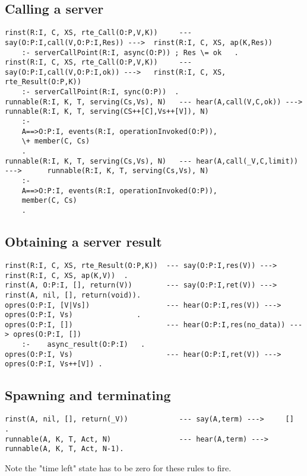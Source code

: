 \subsection{Calling a server}

\begin{verbatim}
rinst(R:I, C, XS, rte_Call(O:P,V,K))     --- say(O:P:I,call(V,O:P:I,Res)) --->  rinst(R:I, C, XS, ap(K,Res))
    :- serverCallPoint(R:I, async(O:P)) ; Res \= ok   .
rinst(R:I, C, XS, rte_Call(O:P,V,K))     --- say(O:P:I,call(V,O:P:I,ok)) --->   rinst(R:I, C, XS, rte_Result(O:P,K))
    :- serverCallPoint(R:I, sync(O:P))  .
runnable(R:I, K, T, serving(Cs,Vs), N)   --- hear(A,call(V,C,ok)) --->          runnable(R:I, K, T, serving(CS++[C],Vs++[V]), N)
    :-
    A==>O:P:I, events(R:I, operationInvoked(O:P)),
    \+ member(C, Cs)
    .
runnable(R:I, K, T, serving(Cs,Vs), N)   --- hear(A,call(_V,C,limit)) --->      runnable(R:I, K, T, serving(Cs,Vs), N)
    :-
    A==>O:P:I, events(R:I, operationInvoked(O:P)),
    member(C, Cs)
    .
\end{verbatim}

\subsection{Obtaining a server result}

\begin{verbatim}
rinst(R:I, C, XS, rte_Result(O:P,K))  --- say(O:P:I,res(V)) --->        rinst(R:I, C, XS, ap(K,V))  .
rinst(A, O:P:I, [], return(V))        --- say(O:P:I,ret(V)) --->        rinst(A, nil, [], return(void)).
opres(O:P:I, [V|Vs])                  --- hear(O:P:I,res(V)) --->       opres(O:P:I, Vs)               .
opres(O:P:I, [])                      --- hear(O:P:I,res(no_data)) ---> opres(O:P:I, [])
    :-    async_result(O:P:I)   .
opres(O:P:I, Vs)                      --- hear(O:P:I,ret(V)) --->       opres(O:P:I, Vs++[V]) .
\end{verbatim}

\subsection{Spawning and terminating}

\begin{verbatim}
rinst(A, nil, [], return(_V))            --- say(A,term) --->     []    .
runnable(A, K, T, Act, N)                --- hear(A,term) --->    runnable(A, K, T, Act, N-1).
\end{verbatim}
Note the "time left" state has to be zero for these rules to fire.


